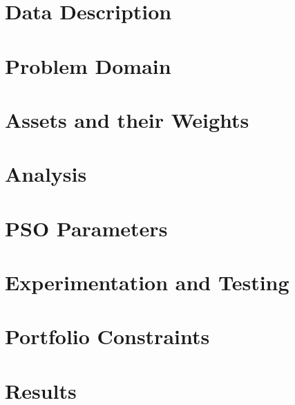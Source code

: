 \documentclass{pdfmx4020}
\begin{document}
  \section{Data Description} %
  \label{sec:data_description}
  

  \section{Problem Domain} %
  \label{sec:problem_domain}
  

  \section{Assets and their Weights} %
  \label{sec:assets_and_their_weights}
  

  \section{Analysis} %
  \label{sec:analysis}
  

  \section{PSO Parameters} %
  \label{sec:pso_parameters}
  

  \section{Experimentation and Testing} %
  \label{sec:experimentation_and_testing}
  

  \section{Portfolio Constraints} %
  \label{sec:portfolio_constraints}
  

  \section{Results} %
  \label{sec:results}
  
\end{document}
